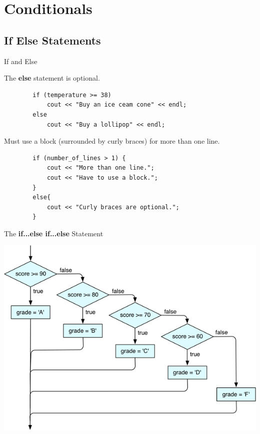 \section{Conditionals}

\subsection{If Else Statements}
\begin{frame}[fragile]{If and Else}{}
    \begin{block}{}
        The \textbf{else} statement is optional.
    \end{block}
    \begin{verbatim}
        if (temperature >= 38)
            cout << "Buy an ice ceam cone" << endl;
        else
            cout << "Buy a lollipop" << endl;
    \end{verbatim}
    \begin{block}{}
        Must use a block (surrounded by curly braces) for more than one line.
    \end{block}
    \begin{verbatim}
        if (number_of_lines > 1) {
            cout << "More than one line.";
            cout << "Have to use a block.";
        }
        else{
            cout << "Curly braces are optional.";
        }
    \end{verbatim}
\end{frame}

\begin{frame}[fragile]{The \textbf{if...else if...else} Statement}{}
    \begin{center}
        \includegraphics[width=.8\linewidth]{images/elseif.png}
    \end{center}
\end{frame}

